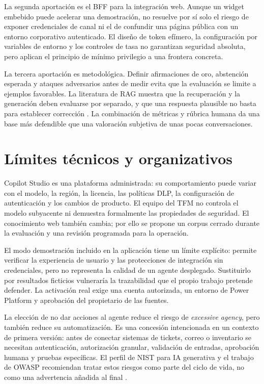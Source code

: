\documentclass[12pt,twoside,titlepage]{book}
\begin{document}
La segunda aportaci\'on es el BFF para la integraci\'on web. Aunque un widget embebido puede acelerar una demostraci\'on, no resuelve por s\'i solo el riesgo de exponer credenciales de canal ni el de confundir una p\'agina p\'ublica con un entorno corporativo autenticado. El dise\~no de token ef\'imero, la configuraci\'on por variables de entorno y los controles de tasa no garantizan seguridad absoluta, pero aplican el principio de m\'inimo privilegio a una frontera concreta.

La tercera aportaci\'on es metodol\'ogica. Definir afirmaciones de oro, abstenci\'on esperada y ataques adversarios antes de medir evita que la evaluaci\'on se limite a ejemplos favorables. La literatura de RAG muestra que la recuperaci\'on y la generaci\'on deben evaluarse por separado, y que una respuesta plausible no basta para establecer correcci\'on \cite{lewis2020rag,ragas2024}. La combinaci\'on de m\'etricas y r\'ubrica humana da una base m\'as defendible que una valoraci\'on subjetiva de unas pocas conversaciones.

\section{L\'imites t\'ecnicos y organizativos}

Copilot Studio es una plataforma administrada: su comportamiento puede variar con el modelo, la regi\'on, la licencia, las pol\'iticas DLP, la configuraci\'on de autenticaci\'on y los cambios de producto. El equipo del TFM no controla el modelo subyacente ni demuestra formalmente las propiedades de seguridad. El conocimiento web tambi\'en cambia; por ello se propone un corpus cerrado durante la evaluaci\'on y una revisi\'on programada para la operaci\'on.

El modo demostraci\'on incluido en la aplicaci\'on tiene un l\'imite expl\'icito: permite verificar la experiencia de usuario y las protecciones de integraci\'on sin credenciales, pero no representa la calidad de un agente desplegado. Sustituirlo por resultados ficticios vulnerar\'ia la trazabilidad que el propio trabajo pretende defender. La activaci\'on real exige una cuenta autorizada, un entorno de Power Platform y aprobaci\'on del propietario de las fuentes.

La elecci\'on de no dar acciones al agente reduce el riesgo de \emph{excessive agency}, pero tambi\'en reduce su automatizaci\'on. Es una concesi\'on intencionada en un contexto de primera versi\'on: antes de conectar sistemas de tickets, correo o inventario se necesitan autenticaci\'on, autorizaci\'on granular, validaci\'on de entradas, aprobaci\'on humana y pruebas espec\'ificas. El perfil de NIST para IA generativa y el trabajo de OWASP recomiendan tratar estos riesgos como parte del ciclo de vida, no como una advertencia a\~nadida al final \cite{nistGenAi2024,owaspLlm2026}.
\end{document}
